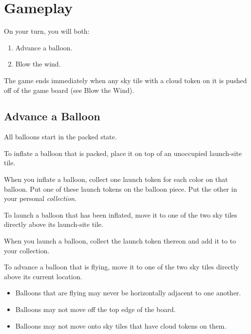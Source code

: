 \documentclass[a6paper, 11pt, parskip=half, DIV=15]{scrartcl}
\begin{document}
\section*{Gameplay}
On your turn, you will both:
\begin{enumerate}[nosep]
  \item Advance a balloon.
  \item Blow the wind.
\end{enumerate}

The game ends immediately when any sky tile with a cloud token on it is pushed off of the game board (see {\setmainfont{Fredoka-Bold}\textcolor{SunriseBlue}{Blow the Wind}}).


\newpage
\enlargethispage{1.75\baselineskip}

\subsection*{Advance a Balloon}
All balloons start in the packed state.

\begin{description}[leftmargin=0pt]
  \item[Inflate:] To inflate a balloon that is packed, place it on top of an unoccupied launch-site tile.
  
    When you inflate a balloon, collect one launch token for each color on that balloon. Put one of these launch tokens on the balloon piece. Put the other in your personal \emph{collection}.

  \item[Launch:] To launch a balloon that has been inflated, move it to one of the two sky tiles directly above its launch-site tile. 
  
  When you launch a balloon, collect the launch token thereon and add it to to your collection.
  
  \item[Ascend:] To advance a balloon that is flying, move it to one of the two sky tiles directly above its current location.
  \begin{itemize}
    \item Balloons that are flying may never be horizontally adjacent to one another.
    \item Balloons may not move off the top edge of the board.
    \item Balloons may not move onto sky tiles that have cloud tokens on them.
  \end{itemize}
\end{description}
\end{document}
